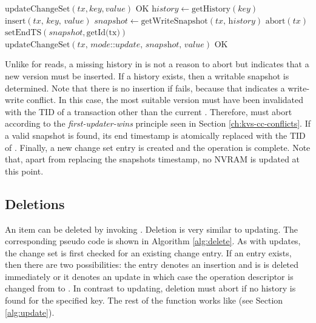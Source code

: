 \begin{algorithm}
\begin{algorithmic}[1]
\State $\text{updateChangeSet}(tx, key, value)$
\State \Return $\text{OK}$
\EndIf
\State $\textit{history} \gets \text{getHistory}(\textit{key})$
\State \Return $\text{insert}(\textit{tx, key, value})$
\EndIf
\State $\textit{snapshot} \gets \text{getWriteSnapshot}(\textit{tx, history})$
\State \Return $\text{abort}(tx)$
\EndIf
\State $\text{setEndTS}(snapshot, \text{getId(tx)})$
\State $\text{updateChangeSet}(\textit{tx, mode::update, snapshot, value})$
\State \Return $\text{OK}$
\EndProcedure
\end{algorithmic}
\caption{}
\label{alg:update}
\end{algorithm}

Unlike for reads, a missing history in  is not a reason to abort but indicates that a new version must be inserted. If a history exists, then a writable snapshot is determined. Note that there is no insertion if  fails, because that indicates a write-write conflict. In this case, the most suitable version must have been invalidated with the TID of a transaction other than the current . Therefore,  must abort according to the \emph{first-updater-wins} principle seen in Section \ref{ch:kvs-cc-conflicts}. If a valid snapshot is found, its end timestamp is atomically replaced with the TID of . Finally, a new change set entry is created and the operation is complete. Note that, apart from replacing the snapshots timestamp, no NVRAM is updated at this point.

\subsection{Deletions}

An item can be deleted by invoking . Deletion is very similar to updating. The corresponding pseudo code is shown in Algorithm \ref{alg:delete}. As with updates, the change set is first checked for an existing change entry. If an entry exists, then there are two possibilities: the entry denotes an insertion and is is deleted immediately or it denotes an update in which case the operation descriptor is changed from  to . In contrast to updating, deletion must abort if no history is found for the specified key. The rest of the function works like  (see Section \ref{alg:update}).

